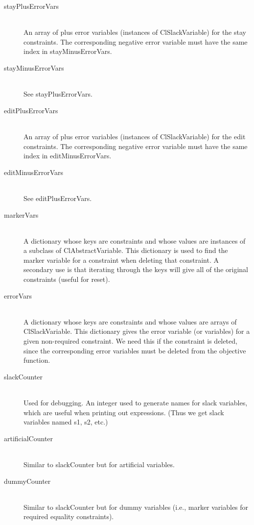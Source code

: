 \documentclass{article}
\begin{document}
\begin{description}
\item[{\sf stayPlusErrorVars}] \ \\
An array of plus error variables (instances
of {\sf ClSlackVariable}) for the stay constraints.  The corresponding
negative error variable must have the same index in {\sf stayMinusErrorVars}.

\item[{\sf stayMinusErrorVars}] \ \\
See {\sf stayPlusErrorVars}.

\item[{\sf editPlusErrorVars}] \ \\
An array of plus error variables (instances
of {\sf ClSlackVariable}) for the edit constraints.  The corresponding
negative error variable must have the same index in {\sf editMinusErrorVars}.

\item[{\sf editMinusErrorVars}] \ \\
See {\sf editPlusErrorVars}.

\item[{\sf markerVars}] \ \\
A dictionary whose keys are constraints and whose
values are instances of a subclass of {\sf ClAbstractVariable}.  This
dictionary is used to find the marker variable for a constraint when
deleting that constraint.  A secondary use is that iterating through the
keys will give all of the original constraints (useful for {\sf reset}).

\item[{\sf errorVars}] \ \\
A dictionary whose keys are constraints and whose
values are arrays of {\sf ClSlackVariable}.  This dictionary gives the
error variable (or variables) for a given non-required constraint.  We need
this if the constraint is deleted, since the corresponding error variables
must be deleted from the objective function.

\item[{\sf slackCounter}] \ \\
Used for debugging.  An integer used to generate
names for slack variables, which are useful when printing out expressions.
(Thus we get slack variables named {\sf s1}, {\sf s2}, etc.)

\item[{\sf artificialCounter}] \ \\
Similar to {\sf slackCounter} but for
artificial variables.

\item[{\sf dummyCounter}]  \ \\
Similar to {\sf slackCounter} but for
dummy variables (i.e., marker variables for required equality constraints).

\end{description}
\end{document}
